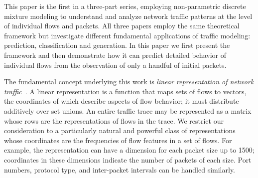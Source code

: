 \documentclass[conference]{IEEEtran}
\title{\vspace{-0.25em}\thetitle}
\author{
{\large{Stefan~Karpinski, John~R.~Gilbert, Elizabeth~M.~Belding}} \vspace{0.25em}\\
Department of Computer Science \\
University of California, Santa Barbara \vspace{0.35em}\\
\textit{\{sgk,gilbert,ebelding\}@cs.ucsb.edu}
}
\begin{document}
\maketitle


This paper is the first in a three-part series, employing non-parametric discrete mixture modeling to understand and analyze network traffic patterns at the level of individual flows and packets.\flownote
All three papers employ the same theoretical framework but investigate different fundamental applications of traffic modeling:
prediction, classification and generation.
In this paper we first present the framework and then demonstrate how it can predict detailed behavior of individual flows from the observation of only a handful of initial packets.

The fundamental concept underlying this work is \emph{linear representation of network traffic}~\cite{Karpinski08}.
A linear representation is a function that maps sets of flows to vectors, the coordinates of which describe aspects of flow behavior;
it must distribute additively over set unions.
An entire traffic trace may be represented as a matrix whose rows are the representations of flows in the trace.
We restrict our consideration to a particularly natural and powerful class of representations whose coordinates are the frequencies of flow features in a set of flows.
For example, the representation can have a dimension for each packet size up to 1500; coordinates in these dimensions indicate the number of packets of each size.
Port numbers,  protocol type, and inter-packet intervals can be handled similarly.
\end{document}
